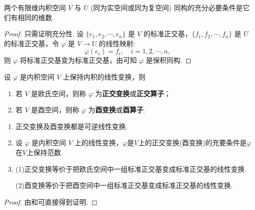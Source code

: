 \documentclass[../../main.tex]{subfiles}
\begin{document}
\begin{corollary}\label{corollary:有限维内积空间同构的充要条件}
两个有限维内积空间 $V$ 与 $U$ (同为实空间或同为复空间) 同构的充分必要条件是它们有相同的维数.
\end{corollary}
\begin{proof}
只需证明充分性. 设 $\{e_1,e_2,\cdots,e_n\}$ 是 $V$ 的标准正交基，$\{f_1,f_2,\cdots,f_n\}$ 是 $U$ 的标准正交基，令 $\varphi$ 是 $V \to U$ 的线性映射:
\[
\varphi(e_i) = f_i,\quad i = 1,2,\cdots,n,
\]
则 $\varphi$ 将标准正交基变为标准正交基，由可知 $\varphi$ 是保积同构.

\end{proof}

\begin{definition}
设 $\varphi$ 是内积空间 $V$ 上保持内积的线性变换，则
\begin{enumerate}
\item 若 $V$ 是欧氏空间，则称 $\varphi$ 为\textbf{正交变换}或\textbf{正交算子}；

\item 若 $V$ 是酉空间，则称 $\varphi$ 为\textbf{酉变换}或\textbf{酉算子}.
\end{enumerate}
\end{definition}

\begin{theorem}\label{theorem:正交变换和酉变换的基本性质}
\begin{enumerate}
\item 正交变换及酉变换都是可逆线性变换.

\item 设 $\varphi$ 是内积空间 $V$ 上的线性变换，$\varphi$是$V$上的正交变换(酉变换)的充要条件是$\varphi$在$V$上保持范数.

\item (1)正交变换等价于把欧氏空间中一组标准正交基变成标准正交基的线性变换.

(2)酉变换等价于把酉空间中一组标准正交基变成标准正交基的线性变换.
\end{enumerate}
\end{theorem}
\begin{proof}
由和可直接得到证明.

\end{proof}
\end{document}

